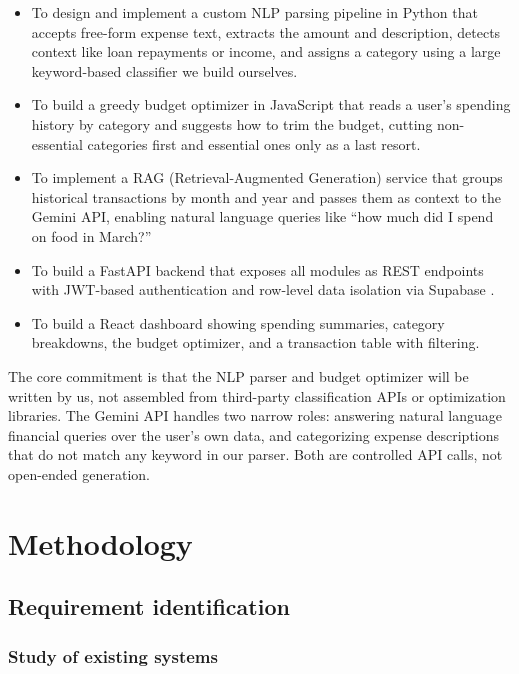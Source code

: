 \documentclass[12pt, a4paper]{article}
\begin{document}
\begin{itemize}
    \item To design and implement a custom NLP parsing pipeline in Python that accepts free-form expense text, extracts the amount and description, detects context like loan repayments or income, and assigns a category using a large keyword-based classifier we build ourselves.
    \item To build a greedy budget optimizer in JavaScript that reads a user's spending history by category and suggests how to trim the budget, cutting non-essential categories first and essential ones only as a last resort.
    \item To implement a RAG (Retrieval-Augmented Generation) service that groups historical transactions by month and year and passes them as context to the Gemini API, enabling natural language queries like ``how much did I spend on food in March?''
    \item To build a FastAPI \cite{fastapi} backend that exposes all modules as REST endpoints with JWT-based authentication and row-level data isolation via Supabase \cite{supabase}.
    \item To build a React \cite{react} dashboard showing spending summaries, category breakdowns, the budget optimizer, and a transaction table with filtering.
\end{itemize}

The core commitment is that the NLP parser and budget optimizer will be written by us, not assembled from third-party classification APIs or optimization libraries. The Gemini API \cite{gemini} handles two narrow roles: answering natural language financial queries over the user's own data, and categorizing expense descriptions that do not match any keyword in our parser. Both are controlled API calls, not open-ended generation.

\newpage
\section{Methodology}

\subsection{Requirement identification}

\subsubsection{Study of existing systems}
\end{document}
